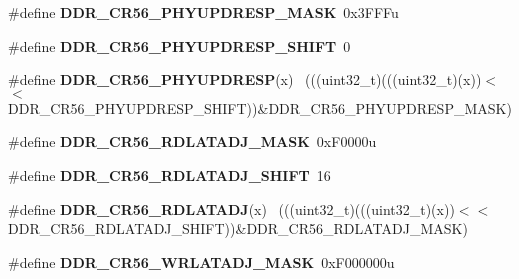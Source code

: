 \begin{DoxyCompactItemize}
\item 
\hypertarget{group___d_d_r___register___masks_gadd92b6dc6a57da2453c71619e9511b7f}{}\#define {\bfseries D\+D\+R\+\_\+\+C\+R56\+\_\+\+P\+H\+Y\+U\+P\+D\+R\+E\+S\+P\+\_\+\+M\+A\+S\+K}~0x3\+F\+F\+Fu\label{group___d_d_r___register___masks_gadd92b6dc6a57da2453c71619e9511b7f}

\item 
\hypertarget{group___d_d_r___register___masks_gaf94f55d5af0f7374bb512f7558481b60}{}\#define {\bfseries D\+D\+R\+\_\+\+C\+R56\+\_\+\+P\+H\+Y\+U\+P\+D\+R\+E\+S\+P\+\_\+\+S\+H\+I\+F\+T}~0\label{group___d_d_r___register___masks_gaf94f55d5af0f7374bb512f7558481b60}

\item 
\hypertarget{group___d_d_r___register___masks_ga288b84390721bd46a88ce5f0c03ac698}{}\#define {\bfseries D\+D\+R\+\_\+\+C\+R56\+\_\+\+P\+H\+Y\+U\+P\+D\+R\+E\+S\+P}(x)                                  ~(((uint32\+\_\+t)(((uint32\+\_\+t)(x))$<$$<$D\+D\+R\+\_\+\+C\+R56\+\_\+\+P\+H\+Y\+U\+P\+D\+R\+E\+S\+P\+\_\+\+S\+H\+I\+F\+T))\&D\+D\+R\+\_\+\+C\+R56\+\_\+\+P\+H\+Y\+U\+P\+D\+R\+E\+S\+P\+\_\+\+M\+A\+S\+K)\label{group___d_d_r___register___masks_ga288b84390721bd46a88ce5f0c03ac698}

\item 
\hypertarget{group___d_d_r___register___masks_ga6fe0fc6d9cafdc02a8882f453a633430}{}\#define {\bfseries D\+D\+R\+\_\+\+C\+R56\+\_\+\+R\+D\+L\+A\+T\+A\+D\+J\+\_\+\+M\+A\+S\+K}~0x\+F0000u\label{group___d_d_r___register___masks_ga6fe0fc6d9cafdc02a8882f453a633430}

\item 
\hypertarget{group___d_d_r___register___masks_ga8499a45de65ae563fa9d9cddcbcd2609}{}\#define {\bfseries D\+D\+R\+\_\+\+C\+R56\+\_\+\+R\+D\+L\+A\+T\+A\+D\+J\+\_\+\+S\+H\+I\+F\+T}~16\label{group___d_d_r___register___masks_ga8499a45de65ae563fa9d9cddcbcd2609}

\item 
\hypertarget{group___d_d_r___register___masks_gaf2186423a813101d74ad56caa06b7d9b}{}\#define {\bfseries D\+D\+R\+\_\+\+C\+R56\+\_\+\+R\+D\+L\+A\+T\+A\+D\+J}(x)                                      ~(((uint32\+\_\+t)(((uint32\+\_\+t)(x))$<$$<$D\+D\+R\+\_\+\+C\+R56\+\_\+\+R\+D\+L\+A\+T\+A\+D\+J\+\_\+\+S\+H\+I\+F\+T))\&D\+D\+R\+\_\+\+C\+R56\+\_\+\+R\+D\+L\+A\+T\+A\+D\+J\+\_\+\+M\+A\+S\+K)\label{group___d_d_r___register___masks_gaf2186423a813101d74ad56caa06b7d9b}

\item 
\hypertarget{group___d_d_r___register___masks_gac1fb624dff63e05cabccf49c23fac78f}{}\#define {\bfseries D\+D\+R\+\_\+\+C\+R56\+\_\+\+W\+R\+L\+A\+T\+A\+D\+J\+\_\+\+M\+A\+S\+K}~0x\+F000000u\label{group___d_d_r___register___masks_gac1fb624dff63e05cabccf49c23fac78f}


\end{DoxyCompactItemize}
